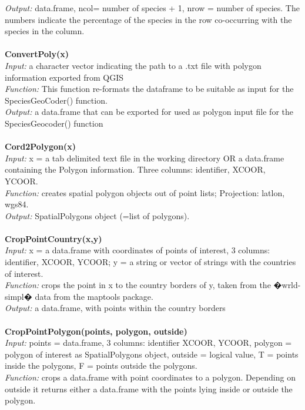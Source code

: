 \documentclass[a4paper,titlepage,11pt]{scrreprt}
\begin{document}
\textit{Output:} data.frame, ncol= number of species + 1, nrow = number of species. The numbers indicate the percentage of the species in the row co-occurring with the species in the column.\\
\\
\textbf{ConvertPoly(x)}\\
\textit{Input:} a character vector indicating the path to a .txt file with polygon information exported from QGIS\\
\textit{Function:} This function re-formats the dataframe to be suitable as input for the SpeciesGeoCoder() function.\\
\textit{Output:} a data.frame that can be exported for used as polygon input file for the SpeciesGeocoder() function\\
\\
\textbf{Cord2Polygon(x)}\\
\textit{Input:} x = a tab delimited text file in the working directory OR a data.frame containing the Polygon information. Three columns: identifier, XCOOR, YCOOR.\\
\textit{Function:} creates spatial polygon objects out of point lists; Projection: latlon, wgs84.\\
\textit{Output:} SpatialPolygons object (=list of polygons).\\
\\
\textbf{CropPointCountry(x,y)}\\
\textit{Input:} x = a data.frame with coordinates of points of interest, 3 columns: identifier, XCOOR, YCOOR; y = a string or vector of strings with the countries of interest.\\
\textit{Function:} crops the point in x to the country borders of y, taken from the �wrld-simpl� data from the maptools package.\\
\textit{Output:} a data.frame, with points within the country borders\\
\\
\textbf{CropPointPolygon(points, polygon, outside)}\\
\textit{Input:} points = data.frame, 3 columns: identifier XCOOR, YCOOR, polygon = polygon of interest as SpatialPolygons object, outside = logical value, T = points inside the polygons, F = points outside the polygons.\\
\textit{Function:} crops a data.frame with point coordinates to a polygon. Depending on outside it returns either a data.frame with the points lying inside or outside the polygon.\\
\end{document}
